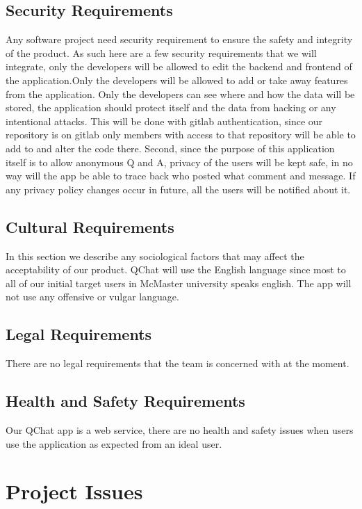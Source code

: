 \documentclass[12pt, titlepage]{article}
\begin{document}
\subsection{Security Requirements}
Any software project need security requirement to ensure the safety and integrity of the product. As such here are a few security requirements that we will integrate, only the developers will be allowed to edit the backend and frontend of the application.Only the developers will be allowed to add or take away features from the application. Only the developers can see where and how the data will be stored, the application should protect itself and the data from hacking or any intentional attacks. This will be done with gitlab authentication, since our repository is on gitlab only members with access to that repository will be able to add to and alter the code there. Second, since the purpose of this application itself is to allow anonymous Q and A, privacy of the users will be kept safe, in no way will the app be able to trace back who posted what comment and message. If any privacy policy changes occur in future, all the users will be notified about it. 

\subsection{Cultural Requirements}
In this section we describe any sociological factors that may affect the acceptability of our product. QChat will use the English language since most to all of our initial target users in McMaster university speaks english. The app will not use any offensive or vulgar language.
        
\subsection{Legal Requirements}
There are no legal requirements that the team is concerned with at the moment. 


\subsection{Health and Safety Requirements}
Our QChat app is a web service, there are no health and safety issues when users use the application as expected from an ideal user.  

\section{Project Issues}
\end{document}
